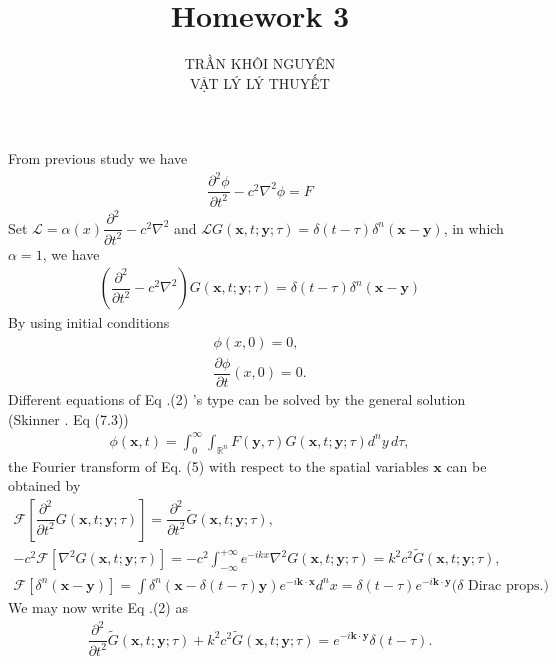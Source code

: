 \documentclass{article}
\title{\Huge{Homework 3}}
\newcommand{\f}[2]{\dfrac{#1}{#2}}
\begin{document}
\setlength{\parindent}{20pt}
\newpage
\author{TRẦN KHÔI NGUYÊN \\ VẬT LÝ LÝ THUYẾT}
\maketitle
From previous study we have
\begin{gather}
	\f{\partial^{2} \phi}{\partial t^{2}} - c^{2} \nabla^{2} \phi = F
\end{gather}
Set $\mathcal{L} = \alpha(x) \f{\partial^{2}}{\partial t^{2}} - c^{2} \nabla^{2}$ and $\mathcal{L} G(\mathbf{x},t;\mathbf{y};\tau) = \delta(t - \tau) \delta^{n}(\mathbf{x} - \mathbf{y})$, in which $\alpha = 1$, we have
\begin{gather}
	\left( \f{\partial^{2}}{\partial t^{2}} - c^{2} {\nabla}^{2} \right) G(\mathbf{x},t;\mathbf{y};\tau) = \delta(t - \tau) \delta^{n}(\mathbf{x} - \mathbf{y})
\end{gather}
By using initial conditions
\begin{gather}
	\phi(x,0) = 0,\\
	\f{\partial \phi}{\partial t}(x,0) = 0.
\end{gather}	
Different equations of Eq .(2) 's type can be solved by the general solution (Skinner . Eq (7.3))
\begin{gather}
	\phi(\mathbf{x},t) = \int_{0}^{\infty} \int_{\mathbb{R}^{n}} F(\mathbf{y}, \tau) G(\mathbf{x},t;\mathbf{y};\tau) d^{n} y\, d \tau,
\end{gather}
the Fourier transform of Eq. (5) with respect to the spatial variables $\mathbf{x}$ can be obtained by
\begin{gather}
	\mathcal{F} \left[\f{\partial^{2}}{\partial t^{2}} G(\mathbf{x},t;\mathbf{y};\tau)\right] = \f{\partial^{2}}{\partial t^{2}} \tilde{G}(\mathbf{x},t;\mathbf{y};\tau),\\
	- c^{2}\mathcal{F}  \left[\nabla^{2} G(\mathbf{x},t;\mathbf{y};\tau)\right] = - c^{2} \int_{-\infty}^{+\infty} e^{-i k x} \nabla^{2} {G}(\mathbf{x},t;\mathbf{y};\tau) = k^{2} c^{2} \tilde{G}(\mathbf{x},t;\mathbf{y};\tau),\\
	\mathcal{F} \left[ \delta^{n}(\mathbf{x} - \mathbf{y}) \right] = \int \delta^{n}(\mathbf{x} - \delta(t - \tau)\mathbf{y}) e^{-i \mathbf{k} \cdot \mathbf{x}} d^{n} {x} = \delta(t - \tau)e^{-i \mathbf{k} \cdot \mathbf{y}} \text{($\delta$ Dirac props.)}
\end{gather} 
We may now write Eq .(2) as 
\begin{gather}
	\f{\partial^{2}}{\partial t^{2}} \tilde{G}(\mathbf{x},t;\mathbf{y};\tau) + k^{2} c^{2} \tilde{G}(\mathbf{x},t;\mathbf{y};\tau)  = e^{-i \mathbf{k} \cdot \mathbf{y}} \delta(t - \tau).
\end{gather}
\end{document}
